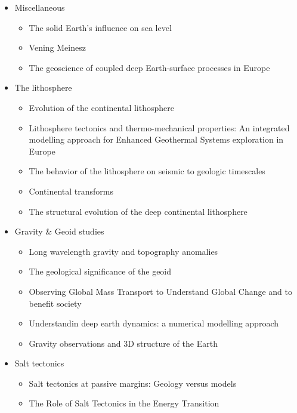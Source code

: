 \begin{itemize}
\item Miscellaneous
   \begin{itemize}
   \item The solid Earth's influence on sea level \cite{conr13}  
   \item Vening Meinesz \cite{vlaa89}
   \item The geoscience of coupled deep Earth-surface processes in Europe \cite{clzb07}
   \end{itemize}

\item The lithosphere
   \begin{itemize}
   \item [\twothousandfive] Evolution of the continental lithosphere \cite{slee05}
   \item [\twothousandten] Lithosphere tectonics and thermo-mechanical properties: An integrated modelling
         approach for Enhanced Geothermal Systems exploration in Europe \cite{clvz10}
   \item [\twothousandthirteen] The behavior of the lithosphere on seismic to geologic timescales \cite{wazh13}
   \item [\twothousandfourteen] Continental transforms \cite{noto14}
   \item [\twothousandseventeen] The structural evolution of the deep continental lithosphere \cite{comm17}
   \end{itemize}

\item Gravity \& Geoid studies
   \begin{itemize}
   \item Long wavelength gravity and topography anomalies \cite{wada81}
   \item The geological significance of the geoid \cite{chas85}
   \item Observing Global Mass Transport to Understand Global Change and to benefit society \cite{pabb15}
   \item Understandin deep earth dynamics: a numerical modelling approach \cite{siag17}
   \item Gravity observations and 3D structure of the Earth \cite{ricl06}\\
   \end{itemize}

\item Salt tectonics
   \begin{itemize}
   \item Salt tectonics at passive margins: Geology versus models \cite{brfo11}
   \item The Role of Salt Tectonics in the Energy Transition \cite{duhp23}
   \end{itemize}



\end{itemize}
